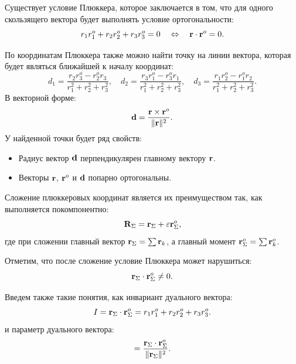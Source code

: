 Существует условие Плюккера, которое заключается в том, что для одного скользящего вектора будет выполнять условие ортогональности:
\begin{equation*}
    r_1 r_1^o + r_2 r_2^o + r_3 r_3^o = 0 \quad \Leftrightarrow \quad \vb{r} \cdot \vb{r}^o = 0.
\end{equation*}

По координатам Плюккера также можно найти точку на линии вектора, которая будет являться ближайшей к началу координат:
\begin{equation*}
    d_1 = \frac{r_2 r_3^o - r_2^o r_3}{r_1^2 + r_2^2 + r_3^2}, \quad d_2 = \frac{r_3 r_1^o - r_3^o r_1}{r_1^2 + r_2^2 + r_3^2}, \quad d_3 = \frac{r_1 r_2^o - r_1^o r_2}{r_1^2 + r_2^2 + r_3^2}.
\end{equation*}
В векторной форме:
\begin{equation*}
    \vb{d} = \frac{\vb{r} \times \vb{r}^o}{\|\vb{r}\|^2}.
\end{equation*}
У найденной точки будет ряд свойств:
\begin{itemize}
    \item Радиус вектор $\vb{d}$ перпендикулярен главному вектору $\vb{r}$.
    \item Векторы $\vb{r}$, $\vb{r}^o$ и $\vb{d}$ попарно ортогональны.
\end{itemize}

Сложение плюккеровых координат является их преимуществом так, как выполняется покомпонентно:
\begin{equation*}
    \vb{R}_\Sigma = \vb{r}_\Sigma + \varepsilon \vb{r}_\Sigma^o,
\end{equation*}
где при сложении главный вектор $\vb{r}_\Sigma = \sum \vb{r}_k$, а главный момент $\vb{r}_\Sigma^o = \sum \vb{r}_k^o$.

Отметим, что после сложение условие Плюккера может нарушиться:
\begin{equation*}
    \vb{r}_\Sigma \cdot \vb{r}_\Sigma^o \neq 0.
\end{equation*}

Введем также такие понятия, как инвариант дуального вектора:
\begin{equation*}
    I = \vb{r}_\Sigma \cdot \vb{r}_\Sigma^o = r_1 r_1^o + r_2 r_2^o + r_3 r_3^o.
\end{equation*}
и параметр дуального вектора:
\begin{equation*}
    [\vb{R}] = \frac{\vb{r}_\Sigma \cdot \vb{r}_\Sigma^o}{\|\vb{r}_\Sigma\|^2}.
\end{equation*}

